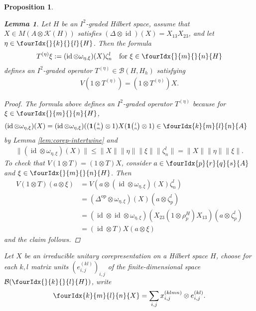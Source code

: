\documentclass[11pt]{article}
\DeclareMathOperator{\id}{id}
\DeclareMathOperator{\op}{\mathrm{op}}
\newcommand{\Grt}[3]{#1{\tiny {\begin{pmatrix} #2\\#3\end{pmatrix}}}}
\newcommand{\UnitC}[2]{\Grt{\mathbf{1}}{#1}{#2}}
\newcommand{\Gr}[5]{\fourIdx{#2}{#4}{#3}{#5}{#1}}%
\newcommand{\Grd}[3]{\Gr{#1}{}{}{#2}{#3}}
\newtheorem{Lem}[Theorem]{Lemma}
\newtheorem{Prop}[Theorem]{Proposition}
\theoremstyle{definition}
\numberwithin{equation}{section}
\begin{document}
\begin{Prop}
\begin{Lem} \label{lem:construct-intertwiner}
  Let $H$ be an $I^{2}$-graded Hilbert space, assume that $X\in M(A
  \otimes \mathcal{K}(H))$ satisfies $(\Delta \otimes
  \id)(X)=X_{13}X_{23}$, and let $\eta\in \Grd{H}{k}{l}$. Then the formula
  \begin{align*}
    T^{(\eta)} \xi := (\id \otimes \omega_{\eta,\xi})(X) \zeta^{l}_{n}
    \quad \text{for } \xi \in \Grd{H}{m}{n}
  \end{align*}
  defines an $I^{2}$-graded  operator $T^{(\eta)} \in \mathcal{B}(H,H_{h})$ satisfying
  \begin{align*}
    V(1\otimes T^{(\eta)}) = (1 \otimes T^{(\eta)})X.
  \end{align*}
\end{Lem}
\begin{proof}
The formula above defines an $I^{2}$-graded  operator $T^{(\eta)}$
because  for $\xi \in \Grd{H}{m}{n}$, 
  \begin{align*}
    (\id \otimes \omega_{\eta,\xi})(X) &=  
    (\id \otimes \omega_{\eta,\xi})((\UnitC{k}{m}\otimes 1)X(\UnitC{l}{n}\otimes
   1) \in \Gr{A}{k}{l}{m}{n}
  \end{align*}
 by Lemma \ref{lem:corep-intertwine}
  and
  \begin{align*}
   \|    (\id \otimes \omega_{\eta,\xi})(X)\| \leq
  \|X\|\|\eta\|\|\xi\|  \| \zeta^{l}_{n}\| =     \|X\|\|\eta\|\|\xi\|.
  \end{align*}
  To check that $V(1\otimes T)=(1\otimes T)X$, consider $a \in \Gr{A}{p}{q}{r}{s}$ and
  $\xi \in \Grd{H}{m}{n}$. Then
  \begin{align*}
    V(1\otimes T)(a\otimes \xi)   &= V(a \otimes (\id \otimes
    \omega_{\eta,\xi})(X)\zeta^{l}_{n}) \\ &=
    (\Delta^{\op} \otimes
    \omega_{\eta,\xi})(X)(a\otimes \zeta^{l}_{p}) \\
    &=  (\id \otimes \id \otimes
    \omega_{\eta,\xi})(X_{23}(1 \otimes \rho^{H}_{p})X_{13})(a\otimes
    \zeta^{l}_{p}) \\
    &= (\id \otimes T)X(a\otimes \xi)
  \end{align*}
and the claim follows.
\end{proof}
  Let $X$ be an irreducible unitary corepresentation on a Hilbert
  space $H$, choose for each $k,l$ matrix units
  $(e^{(kl)}_{i,j})_{i,j}$ of the finite-dimensional space
  $\mathcal{B}(\Grd{H}{k}{l})$, write
  \begin{align*}
    \Gr{X}{k}{l}{m}{n} =  \sum_{i,j} x^{(klmn)}_{i,j} \otimes e^{(kl)}_{i,j}.

\end{align*}
\end{Prop}
\end{document}
